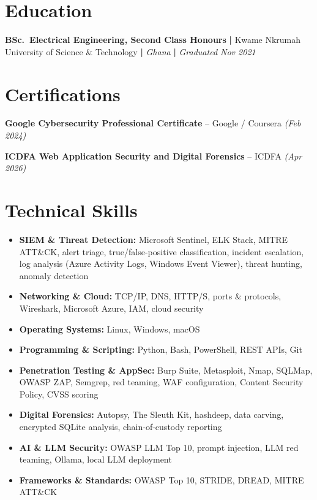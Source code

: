 \documentclass[letterpaper,11pt]{article}
\begin{document}
\section{Education}

\noindent
\textbf{BSc.\ Electrical Engineering, Second Class Honours} \textbf{|}
Kwame Nkrumah University of Science \& Technology \textbf{|} \textit{Ghana} \textbf{|}
\textit{Graduated Nov 2021}

\section{Certifications}

\noindent
\textbf{Google Cybersecurity Professional Certificate} -- Google / Coursera \textit{(Feb 2024)}

\noindent
\textbf{ICDFA Web Application Security and Digital Forensics} -- ICDFA \textit{(Apr 2026)}

\section{Technical Skills}

\begin{itemize}
  \item \textbf{SIEM \& Threat Detection:} Microsoft Sentinel, ELK Stack, MITRE ATT\&CK, alert triage,
        true/false-positive classification, incident escalation, log analysis (Azure Activity Logs,
        Windows Event Viewer), threat hunting, anomaly detection
  \item \textbf{Networking \& Cloud:} TCP/IP, DNS, HTTP/S, ports \& protocols, Wireshark,
        Microsoft Azure, IAM, cloud security
  \item \textbf{Operating Systems:} Linux, Windows, macOS
  \item \textbf{Programming \& Scripting:} Python, Bash, PowerShell, REST APIs, Git
  \item \textbf{Penetration Testing \& AppSec:} Burp Suite, Metasploit, Nmap, SQLMap, OWASP ZAP,
        Semgrep, red teaming, WAF configuration, Content Security Policy, CVSS scoring
  \item \textbf{Digital Forensics:} Autopsy, The Sleuth Kit, hashdeep, data carving, encrypted SQLite
        analysis, chain-of-custody reporting
  \item \textbf{AI \& LLM Security:} OWASP LLM Top 10, prompt injection, LLM red teaming, Ollama,
        local LLM deployment
  \item \textbf{Frameworks \& Standards:} OWASP Top 10, STRIDE, DREAD, MITRE ATT\&CK
\end{itemize}
\end{document}
